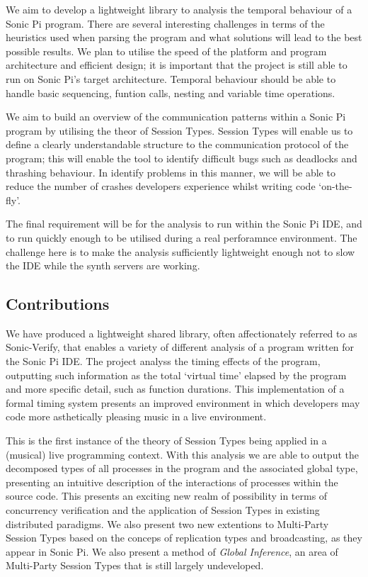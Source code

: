 \documentclass[11pt, abstracton, twoside, titlepage=true]{scrartcl}
\begin{document}
We aim to develop a lightweight library to analysis the temporal behaviour of a 
Sonic Pi program. There are several interesting challenges in terms of 
the heuristics used when parsing the program and what solutions will lead to the 
best possible results. We plan to utilise the speed of the platform and program 
architecture and efficient design; it is important that the project is still 
able to run on Sonic Pi's target architecture. Temporal behaviour should be able 
to handle basic sequencing, funtion calls, nesting and variable time operations. 

We aim to build an overview of the communication patterns within a Sonic Pi program 
by utilising the theor of Session Types. Session Types will
enable us to define a clearly understandable structure to the communication
protocol of the program; this will enable the tool to identify difficult bugs
such as deadlocks and thrashing behaviour. In identify problems in this manner,
we will be able to reduce the number of crashes developers experience whilst 
writing code `on-the-fly'. 

The final requirement will be for the analysis to run within the Sonic Pi IDE, 
and to run quickly enough to be utilised during a real perforamnce environment. 
The challenge here is to make the analysis sufficiently lightweight enough not to
slow the IDE while the synth servers are working. 

\subsection{Contributions}
We have produced a lightweight shared library, often affectionately referred to 
as Sonic-Verify, that enables a variety of different analysis of a program 
written for the Sonic Pi IDE. The project analyss the timing effects of the 
program, outputting such information as the total `virtual time' elapsed by the 
program and more specific detail, such as function durations. This implementation
of a formal timing system presents an improved environment in which developers
may code more asthetically pleasing music in a live environment.

This is the first instance of the theory of Session Types being applied in 
a (musical) live programming context. With this analysis we are able to output 
the decomposed types of all processes in the program and the associated global 
type, presenting an intuitive description of the interactions of processes 
within the source code. This presents an exciting new realm of possibility in
terms of concurrency verification and the application of Session Types in 
existing distributed paradigms. We also present two new extentions to Multi-Party 
Session Types based on the conceps of replication types and broadcasting, as they 
appear in Sonic Pi. We also present a method of \emph{Global Inference}, an area 
of Multi-Party Session Types that is still largely undeveloped.
\end{document}
